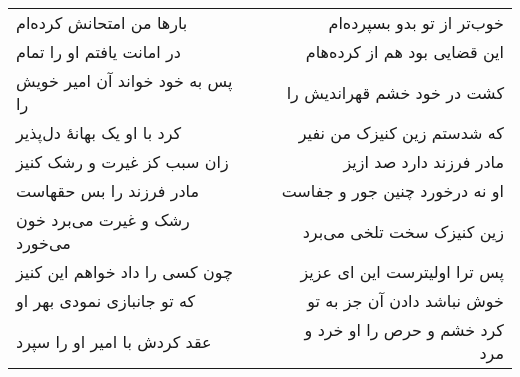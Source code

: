 \begin{center}
\begin{longtable}{l p{0.5cm} r}
بارها من امتحانش کرده‌ام
&&
خوب‌تر از تو بدو بسپرده‌ام
\\
در امانت یافتم او را تمام
&&
این قضایی بود هم از کرده‌هام
\\
پس به خود خواند آن امیر خویش را
&&
کشت در خود خشم قهراندیش را
\\
کرد با او یک بهانهٔ دل‌پذیر
&&
که شدستم زین کنیزک من نفیر
\\
زان سبب کز غیرت و رشک کنیز
&&
مادر فرزند دارد صد ازیز
\\
مادر فرزند را بس حقهاست
&&
او نه درخورد چنین جور و جفاست
\\
رشک و غیرت می‌برد خون می‌خورد
&&
زین کنیزک سخت تلخی می‌برد
\\
چون کسی را داد خواهم این کنیز
&&
پس ترا اولیترست این ای عزیز
\\
که تو جانبازی نمودی بهر او
&&
خوش نباشد دادن آن جز به تو
\\
عقد کردش با امیر او را سپرد
&&
کرد خشم و حرص را او خرد و مرد
\\
\end{longtable}
\end{center}
